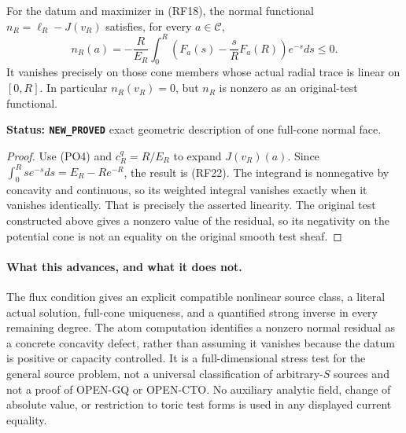 \begin{corollary}
\label{cor:r12-radial-atom-normal-concavity}
For the datum and maximizer in \textup{(RF18)}, the
normal functional $n_R=\ell_R-J(v_R)$ satisfies,
for every $a\in\mathscr C$,
\[
 n_R(a)=-\frac R{E_R}\int_0^R
          \left(F_a(s)-\frac{s}{R}F_a(R)\right)e^{-s}ds\le0.
 \tag{RF22}
\]
It vanishes precisely on those cone members whose
actual radial trace is linear on $[0,R]$.
In particular $n_R(v_R)=0$, but $n_R$ is nonzero
as an original-test functional.
\end{corollary}

\noindent\textbf{Status: \texttt{NEW\_PROVED}} exact
geometric description of one full-cone normal face.

\begin{proof}
Use \textup{(PO4)} and $c_R^q=R/E_R$ to expand
$J(v_R)(a)$.  Since
$\int_0^Rse^{-s}ds=E_R-Re^{-R}$, the result is
\textup{(RF22)}.  The integrand is nonnegative by
concavity and continuous, so its weighted integral
vanishes exactly when it vanishes identically.
That is precisely the asserted linearity.  The
original test constructed above gives a nonzero
value of the residual, so its negativity on the
potential cone is not an equality on the original
smooth test sheaf.
\end{proof}

\paragraph{What this advances, and what it does not.}
The flux condition gives an explicit compatible
nonlinear source class, a literal actual solution,
full-cone uniqueness, and a quantified strong inverse
in every remaining degree.  The atom computation
identifies a nonzero normal residual as a concrete
concavity defect, rather than assuming it vanishes
because the datum is positive or capacity controlled.
It is a full-dimensional stress test for the general
source problem, not a universal classification of
arbitrary-$S$ sources and not a proof of OPEN-GQ or
OPEN-CTO.  No auxiliary analytic field, change of
absolute value, or restriction to toric test forms
is used in any displayed current equality.
